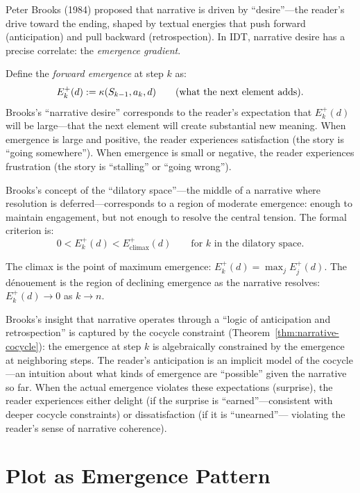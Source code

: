 \begin{remark}
\label{rem:brooks}
Peter Brooks (1984) proposed that narrative is driven by ``desire''---the
reader's drive toward the ending, shaped by textual energies that push
forward (anticipation) and pull backward (retrospection).  In IDT, narrative
desire has a precise correlate: the \emph{emergence gradient}.

Define the \emph{forward emergence} at step $k$ as:
\[
  E_k^+(d) := \kappa(S_{k-1}, a_k, d) \qquad \text{(what the next element adds)}.
\]
Brooks's ``narrative desire'' corresponds to the reader's expectation that
$E_k^+(d)$ will be large---that the next element will create substantial new
meaning.  When emergence is large and positive, the reader experiences
satisfaction (the story is ``going somewhere'').  When emergence is small or
negative, the reader experiences frustration (the story is ``stalling'' or
``going wrong'').

Brooks's concept of the ``dilatory space''---the middle of a narrative where
resolution is deferred---corresponds to a region of moderate emergence:
enough to maintain engagement, but not enough to resolve the central tension.
The formal criterion is:
\[
  0 < E_k^+(d) < E_{\text{climax}}^+(d) \qquad \text{for } k \text{ in the
  dilatory space}.
\]

The climax is the point of maximum emergence: $E_k^+(d) = \max_j E_j^+(d)$.
The dénouement is the region of declining emergence as the narrative resolves:
$E_k^+(d) \to 0$ as $k \to n$.

Brooks's insight that narrative operates through a ``logic of anticipation
and retrospection'' is captured by the cocycle constraint
(Theorem~\ref{thm:narrative-cocycle}): the emergence at step $k$ is
algebraically constrained by the emergence at neighboring steps.  The reader's
anticipation is an implicit model of the cocycle---an intuition about what
kinds of emergence are ``possible'' given the narrative so far.  When the
actual emergence violates these expectations (surprise), the reader
experiences either delight (if the surprise is ``earned''---consistent with
deeper cocycle constraints) or dissatisfaction (if it is ``unearned''---
violating the reader's sense of narrative coherence).
\end{remark}


\section{Plot as Emergence Pattern}

